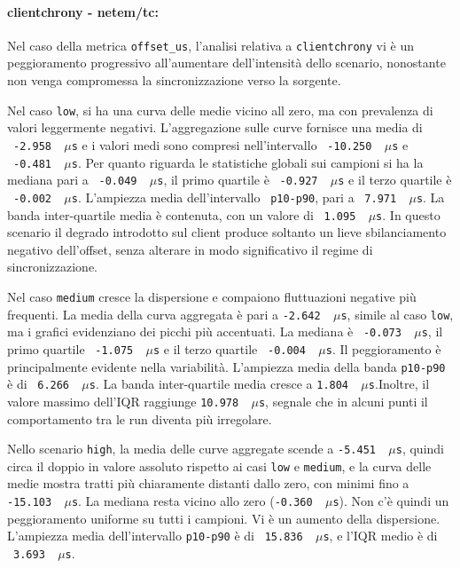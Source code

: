 \paragraph*{clientchrony - netem/tc:}
Nel caso della metrica \texttt{offset\_us}, l'analisi relativa a \texttt{clientchrony}
vi è un peggioramento progressivo all'aumentare dell'intensità dello scenario, nonostante
non venga compromessa la sincronizzazione verso la sorgente.

Nel caso \texttt{low}, si ha una curva delle medie vicino all zero, ma con
prevalenza di valori leggermente negativi. L'aggregazione sulle curve fornisce una
media di ~\texttt{-2.958 \,$\mu$s} e i valori medi sono compresi nell'intervallo ~\texttt{-10.250
\,$\mu$s} e ~\texttt{-0.481 \,$\mu$s}. Per quanto riguarda le statistiche
globali sui campioni si ha la mediana pari a ~\texttt{-0.049 \,$\mu$s}, il primo quartile
è ~\texttt{-0.927 \,$\mu$s} e il terzo quartile è ~\texttt{-0.002 \,$\mu$s}. L'ampiezza
media dell'intervallo ~\texttt{p10-p90}, pari a ~\texttt{7.971 \,$\mu$s}. La
banda inter-quartile media è contenuta, con un valore di ~\texttt{1.095 \,$\mu$s}.
In questo scenario il degrado introdotto sul client produce soltanto un lieve
sbilanciamento negativo dell'offset, senza alterare in modo significativo il regime
di sincronizzazione.

Nel caso \texttt{medium} cresce la dispersione e compaiono fluttuazioni negative
più frequenti. La media della curva aggregata è pari a \texttt{-2.642 \,$\mu$s}, simile
al caso \texttt{low}, ma i grafici evidenziano dei picchi più accentuati. La
mediana è ~\texttt{-0.073 \,$\mu$s}, il primo quartile ~\texttt{-1.075 \,$\mu$s} e
il terzo quartile ~\texttt{-0.004 \,$\mu$s}. Il peggioramento è principalmente
evidente nella variabilità. L'ampiezza media della banda \texttt{p10-p90} è di ~\texttt{6.266
\,$\mu$s}. La banda inter-quartile media cresce a \texttt{1.804 \,$\mu$s}.Inoltre,
il valore massimo dell'IQR raggiunge \texttt{10.978 \,$\mu$s}, segnale che in
alcuni punti il comportamento tra le run diventa più irregolare.

Nello scenario \texttt{high}, la media delle curve aggregate scende a \texttt{-5.451
\,$\mu$s}, quindi circa il doppio in valore assoluto rispetto ai casi \texttt{low}
e \texttt{medium}, e la curva delle medie mostra tratti più chiaramente distanti dallo
zero, con minimi fino a \texttt{-15.103 \,$\mu$s}. La mediana resta vicino allo
zero (\texttt{-0.360 \,$\mu$s}). Non c'è quindi un peggioramento uniforme su
tutti i campioni. Vi è un aumento della dispersione. L'ampiezza media dell'intervallo
\texttt{p10-p90} è di ~\texttt{15.836 \,$\mu$s}, e l'IQR medio è di ~\texttt{3.693
\,$\mu$s}.

